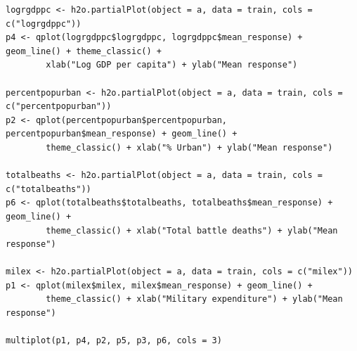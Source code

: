 \begin{verbatim}
logrgdppc <- h2o.partialPlot(object = a, data = train, cols = c("logrgdppc"))
p4 <- qplot(logrgdppc$logrgdppc, logrgdppc$mean_response) + geom_line() + theme_classic() +
        xlab("Log GDP per capita") + ylab("Mean response")

percentpopurban <- h2o.partialPlot(object = a, data = train, cols = c("percentpopurban"))
p2 <- qplot(percentpopurban$percentpopurban, percentpopurban$mean_response) + geom_line() +
        theme_classic() + xlab("% Urban") + ylab("Mean response")

totalbeaths <- h2o.partialPlot(object = a, data = train, cols = c("totalbeaths"))
p6 <- qplot(totalbeaths$totalbeaths, totalbeaths$mean_response) + geom_line() +
        theme_classic() + xlab("Total battle deaths") + ylab("Mean response")

milex <- h2o.partialPlot(object = a, data = train, cols = c("milex"))
p1 <- qplot(milex$milex, milex$mean_response) + geom_line() +
        theme_classic() + xlab("Military expenditure") + ylab("Mean response")

multiplot(p1, p4, p2, p5, p3, p6, cols = 3)
\end{verbatim}


\doublespacing
\normalsize